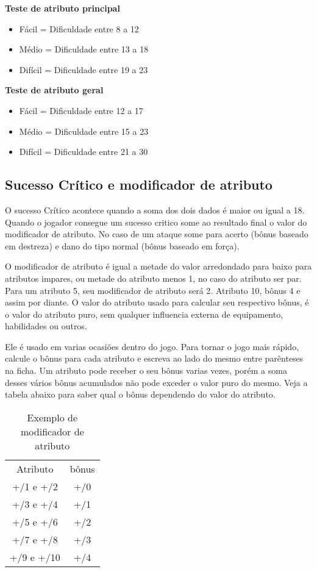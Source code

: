 \textbf{Teste de atributo principal}
\begin{itemize}
	\item Fácil = Dificuldade entre 8 a 12
	\item Médio = Dificuldade entre 13 a 18
	\item Difícil = Dificuldade entre 19 a 23
\end{itemize}

\textbf{Teste de atributo geral}
\begin{itemize}
	\item Fácil = Dificuldade entre 12 a 17 
	\item Médio = Dificuldade entre 15 a 23
	\item Difícil = Dificuldade entre 21 a 30
\end{itemize}

\subsection{Sucesso Crítico e modificador de atributo}

O sucesso Crítico acontece quando a soma dos dois dados é maior ou igual a 18. Quando o jogador consegue um sucesso critico some ao resultado final o valor do modificador de atributo. No caso de um ataque some para acerto (bônus baseado em destreza) e dano do tipo normal (bônus baseado em força).

O modificador de atributo é igual a metade do valor arredondado para baixo para atributos impares, ou metade do atributo menos 1, no caso do atributo ser par. Para um atributo 5, seu modificador de atributo será 2. Atributo 10, bônus 4 e assim por diante. O valor do atributo usado para calcular seu respectivo bônus, é o valor do atributo puro, sem qualquer influencia externa de equipamento, habilidades ou outros.

Ele é usado em varias ocasiões dentro do jogo. Para tornar o jogo mais rápido, calcule o bônus para cada atributo e escreva ao lado do mesmo entre parênteses na ficha. Um atributo pode receber o seu bônus varias vezes, porém a soma desses vários bônus acumulados não pode exceder o valor puro do mesmo. Veja a tabela abaixo para saber qual o bônus dependendo do valor do atributo.

\begin{table}[htbp]
\begin{center}
\begin{tabular}{|c|c|} \hline 
Atributo&	 bônus\\\cline{1-2} 
+/1 e +/2&	 +/0\\ \hline
+/3 e +/4&	 +/1\\ \hline
+/5 e +/6&	 +/2\\ \hline
+/7 e +/8&	 +/3\\ \hline
+/9 e +/10&	 +/4\\ \hline
\end{tabular}
\end{center}
\caption{Exemplo de modificador de atributo}
\label{}
\end{table}


